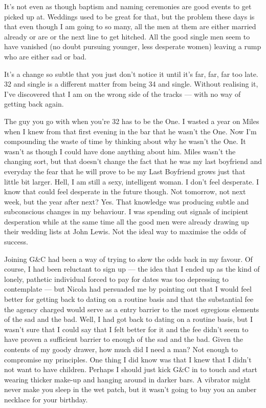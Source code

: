 It's not even as though baptism and naming ceremonies are good
events to get picked up at. Weddings used to be great for that, but
the problem these days is that even though I am going to so many,
all the men at them are either married already or are or the next
line to get hitched. All the good single men seem to have vanished
(no doubt pursuing younger, less desperate women) leaving a rump who
are either sad or bad.

It's a change so subtle that you just don't notice it until it's
far, far, far too late. 32 and single is a different matter from
being 34 and single. Without realising it, I've discovered that I am
on the wrong side of the tracks --- with no way of getting back
again.

The guy you go with when you're 32 has to be the One. I wasted a
year on Miles when I knew from that first evening in the bar that he
wasn't the One. Now I'm compounding the waste of time by thinking
about why he wasn't the One. It wasn't as though I could have done
anything about him. Miles wasn't the changing sort, but that doesn't
change the fact that he was my last boyfriend and everyday the fear
that he will prove to be my Last Boyfriend grows just that little bit
larger. Hell, I am still a sexy, intelligent woman. I don't feel
desperate. I know that could feel desperate in the future though.
Not tomorrow, not next week, but the year after next? Yes. That
knowledge was producing subtle and subconscious changes in my
behaviour. I was spending out signals of incipient desperation while
at the same time all the good men were already drawing up their
wedding lists at John Lewis. Not the ideal way to maximise the odds
of success.

Joining G{\&}C had been a way of trying to skew the odds back in my
favour. Of course, I had been reluctant to sign up --- the idea that
I ended up as the kind of lonely, pathetic individual forced to pay
for dates was too depressing to contemplate --- but Nicola had
persuaded me by pointing out that I would feel better for getting
back to dating on a routine basis and that the substantial fee the
agency charged would serve as a entry barrier to the most egregious
elements of the sad and the bad. Well, I had got back to dating on a
routine basis, but I wasn't sure that I could say that I felt better
for it and the fee didn't seem to have proven a sufficient barrier
to enough of the sad and the bad. Given the contents of my goody
drawer, how much did I need a man? Not enough to compromise my
principles. One thing I did know was that I knew that I didn't not
want to have children. Perhaps I should just kick G{\&}C in to touch
and start wearing thicker make-up and hanging around in darker bars.
A vibrator might never make you sleep in the wet patch, but it
wasn't going to buy you an amber necklace for your birthday.

